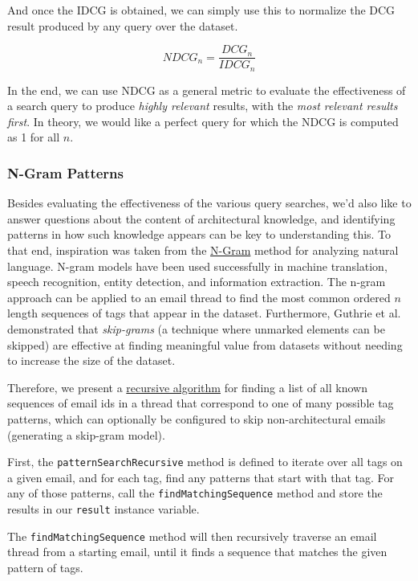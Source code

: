 \documentclass[a4paper, 12pt]{article}
\begin{document}
			And once the IDCG is obtained, we can simply use this to normalize the DCG result produced by any query over the dataset.
			
			\begin{equation}
				\tag{NDCG}
				NDCG_n = \frac{DCG_n}{IDCG_n}
				\label{eqn:ndcg}
			\end{equation}
		
			In the end, we can use NDCG as a general metric to evaluate the effectiveness of a search query to produce \textit{highly relevant} results, with the \textit{most relevant results first}. In theory, we would like a perfect query for which the NDCG is computed as 1 for all $ n $\cite{denboon}.
			
		\subsubsection{N-Gram Patterns}
			Besides evaluating the effectiveness of the various query searches, we'd also like to answer questions about the content of architectural knowledge, and identifying patterns in how such knowledge appears can be key to understanding this. To that end, inspiration was taken from the \href{https://en.wikipedia.org/wiki/N-gram}{N-Gram} method for analyzing natural language. N-gram models have been used successfully in machine translation, speech recognition, entity detection, and information extraction\cite{google-ngram}. The n-gram approach can be applied to an email thread to find the most common ordered $ n $ length sequences of tags that appear in the dataset. Furthermore, Guthrie et al. demonstrated that \textit{skip-grams} (a technique where unmarked elements can be skipped) are effective at finding meaningful value from datasets without needing to increase the size of the dataset\cite{guthrie}.
			
			Therefore, we present a \hyperref[sec:pattern-algorithm]{recursive algorithm} for finding a list of all known sequences of email ids in a thread that correspond to one of many possible tag patterns, which can optionally be configured to skip non-architectural emails (generating a skip-gram model).
			
			First, the \texttt{patternSearchRecursive} method is defined to iterate over all tags on a given email, and for each tag, find any patterns that start with that tag. For any of those patterns, call the \texttt{findMatchingSequence} method and store the results in our \texttt{result} instance variable.
			
			The \texttt{findMatchingSequence} method will then recursively traverse an email thread from a starting email, until it finds a sequence that matches the given pattern of tags.
			
\end{document}
